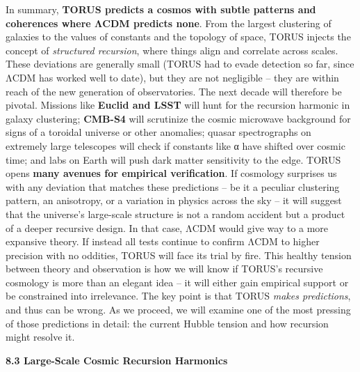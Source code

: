 In summary, \textbf{TORUS predicts a cosmos with subtle patterns and
coherences where ΛCDM predicts none}. From the largest clustering of
galaxies to the values of constants and the topology of space, TORUS
injects the concept of \emph{structured recursion}, where things align
and correlate across scales. These deviations are generally small (TORUS
had to evade detection so far, since ΛCDM has worked well to date), but
they are not negligible -- they are within reach of the new generation
of observatories. The next decade will therefore be pivotal. Missions
like \textbf{Euclid and LSST} will hunt for the recursion harmonic in
galaxy clustering; \textbf{CMB-S4} will scrutinize the cosmic microwave
background for signs of a toroidal universe or other anomalies​; quasar
spectrographs on extremely large telescopes will check if constants like
α have shifted over cosmic time​; and labs on Earth will push dark
matter sensitivity to the edge. TORUS opens \textbf{many avenues for
empirical verification}​. If cosmology surprises us with any deviation
that matches these predictions -- be it a peculiar clustering pattern,
an anisotropy, or a variation in physics across the sky -- it will
suggest that the universe's large-scale structure is not a random
accident but a product of a deeper recursive design. In that case, ΛCDM
would give way to a more expansive theory. If instead all tests continue
to confirm ΛCDM to higher precision with no oddities, TORUS will face
its trial by fire. This healthy tension between theory and observation
is how we will know if TORUS's recursive cosmology is more than an
elegant idea -- it will either gain empirical support or be constrained
into irrelevance. The key point is that TORUS \emph{makes predictions},
and thus can be wrong. As we proceed, we will examine one of the most
pressing of those predictions in detail: the current Hubble tension and
how recursion might resolve it.

\textbf{8.3 Large-Scale Cosmic Recursion Harmonics}

